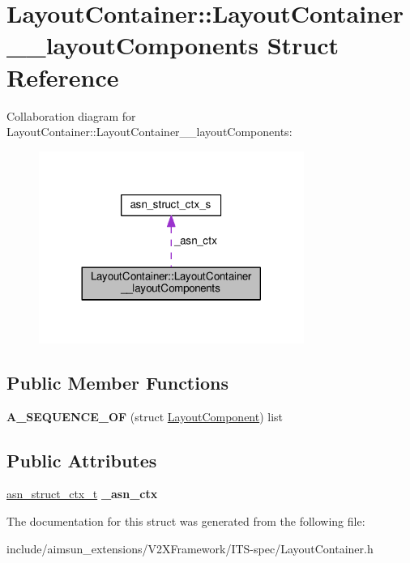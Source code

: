 \hypertarget{structLayoutContainer_1_1LayoutContainer____layoutComponents}{}\section{Layout\+Container\+:\+:Layout\+Container\+\_\+\+\_\+layout\+Components Struct Reference}
\label{structLayoutContainer_1_1LayoutContainer____layoutComponents}


Collaboration diagram for Layout\+Container\+:\+:Layout\+Container\+\_\+\+\_\+layout\+Components\+:\nopagebreak
\begin{figure}[H]
\begin{center}
\leavevmode
\includegraphics[width=245pt]{structLayoutContainer_1_1LayoutContainer____layoutComponents__coll__graph}
\end{center}
\end{figure}
\subsection*{Public Member Functions}
\begin{DoxyCompactItemize}
\item 
{\bfseries A\+\_\+\+S\+E\+Q\+U\+E\+N\+C\+E\+\_\+\+OF} (struct \hyperlink{structLayoutComponent}{Layout\+Component}) list\hypertarget{structLayoutContainer_1_1LayoutContainer____layoutComponents_aaa08733171c6c144275187ecb0badff9}{}\label{structLayoutContainer_1_1LayoutContainer____layoutComponents_aaa08733171c6c144275187ecb0badff9}

\end{DoxyCompactItemize}
\subsection*{Public Attributes}
\begin{DoxyCompactItemize}
\item 
\hyperlink{structasn__struct__ctx__s}{asn\+\_\+struct\+\_\+ctx\+\_\+t} {\bfseries \+\_\+asn\+\_\+ctx}\hypertarget{structLayoutContainer_1_1LayoutContainer____layoutComponents_a271474ef42e8cc6cc463cf05e9be0f81}{}\label{structLayoutContainer_1_1LayoutContainer____layoutComponents_a271474ef42e8cc6cc463cf05e9be0f81}

\end{DoxyCompactItemize}


The documentation for this struct was generated from the following file\+:\begin{DoxyCompactItemize}
\item 
include/aimsun\+\_\+extensions/\+V2\+X\+Framework/\+I\+T\+S-\/spec/Layout\+Container.\+h\end{DoxyCompactItemize}
